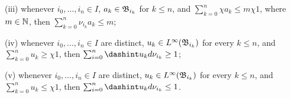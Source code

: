 \quad(iii) whenever $i_0,\ldots,i_n\in I$, $a_k\in\frak B_{i_k}$ for
$k\le n$, and $\sum_{k=0}^n\chi a_k\le m\chi 1$, where $m\in\Bbb N$,
then $\sum_{k=0}^n\nu_{i_k}a_k\le m$;

\ifdim\pagewidth>467pt\fontdimen3\tenrm=2pt\fi
\ifdim\pagewidth>467pt\fontdimen4\tenrm=1.67pt\fi
\quad(iv) whenever $i_0,\ldots,i_n\in I$ are distinct,
$u_k\in L^{\infty}(\frak B_{i_k})$ for every $k\le n$, and
$\sum_{k=0}^nu_k\ge\chi 1$, then
$\sum_{i=0}^n\dashint u_kd\nu_{i_k}\ge 1$;
\tenrm=1.67pt
\tenrm=1.11pt

\quad(v) whenever $i_0,\ldots,i_n\in I$ are distinct,
$u_k\in L^{\infty}(\frak B_{i_k})$ for every $k\le n$, and
$\sum_{k=0}^nu_k\le\chi 1$, then
$\sum_{i=0}^n\dashint u_kd\nu_{i_k}\le 1$.


